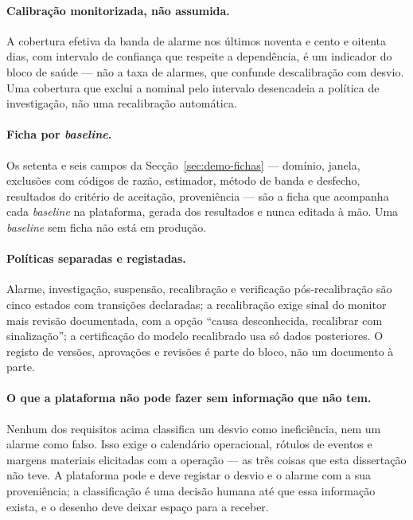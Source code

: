 \paragraph{Calibração monitorizada, não assumida.} A cobertura efetiva da
banda de alarme nos últimos noventa e cento e oitenta dias, com intervalo de
confiança que respeite a dependência, é um indicador do bloco de saúde ---
não a taxa de alarmes, que confunde descalibração com desvio. Uma cobertura
que exclui a nominal pelo intervalo desencadeia a política de investigação,
não uma recalibração automática.

\paragraph{Ficha por \emph{baseline}.} Os setenta e seis campos da
Secção~\ref{sec:demo-fichas} --- domínio, janela, exclusões com códigos de
razão, estimador, método de banda e desfecho, resultados do critério de
aceitação, proveniência --- são a ficha que acompanha cada \emph{baseline}
na plataforma, gerada dos resultados e nunca editada à mão. Uma
\emph{baseline} sem ficha não está em produção.

\paragraph{Políticas separadas e registadas.} Alarme, investigação, suspensão,
recalibração e verificação pós-recalibração são cinco estados com transições
declaradas; a recalibração exige sinal do monitor mais revisão documentada,
com a opção ``causa desconhecida, recalibrar com sinalização''; a
certificação do modelo recalibrado usa só dados posteriores. O registo de
versões, aprovações e revisões é parte do bloco, não um documento à parte.

\paragraph{O que a plataforma não pode fazer sem informação que não tem.}
Nenhum dos requisitos acima classifica um desvio como ineficiência, nem um
alarme como falso. Isso exige o calendário operacional, rótulos de eventos e
margens materiais elicitadas com a operação --- as três coisas que esta
dissertação não teve. A plataforma pode e deve registar o desvio e o alarme
com a sua proveniência; a classificação é uma decisão humana até que essa
informação exista, e o desenho deve deixar espaço para a receber.

